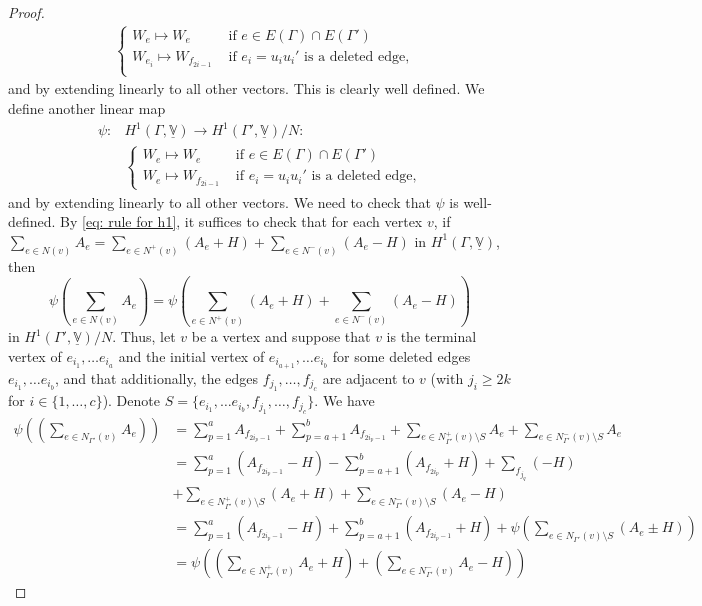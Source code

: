 \documentclass{article}
\theoremstyle{definition}
\theoremstyle{remark}
\begin{document}
\begin{proof}
\begin{equation*}
\begin{array}{cl}
   &\begin{cases}
    W_{e} \mapsto W_{e} &\text{ if $e\in E(\Gamma) \cap E(\Gamma') $}\\
   W_{e_i} \mapsto W_{f_{2i - 1}} &\text{ if $e_i=u_iu_{i}'$ is a deleted edge},\\
   \end{cases}
\end{array}
\end{equation*}
and by extending linearly to all other vectors. This is clearly well defined. We define another linear map
\begin{equation*}
\begin{array}{cl}
   \psi: &H^{1}(\Gamma, \underline{\mathbb{V}}) \rightarrow H^{1}(\Gamma', \underline{\mathbb{V}})/N:\\
   &\begin{cases}
    W_{e} \mapsto W_{e} &\text{ if $e \in E(\Gamma) \cap E(\Gamma')$}\\
    W_{e} \mapsto W_{f_{2i -1}} &\text{ if $e_i=u_iu_{i}'$ is a deleted edge,}
    \end{cases}
\end{array}
\end{equation*}
and by extending linearly to all other vectors.
We need to check that $\psi$ is well-defined. By \eqref{eq: rule for h1}, it suffices to check that for each vertex $v$, if $\sum_{e\in N(v)} A_{e} = \sum_{e\in N^{+}(v)} (A_{e} + H)+ \sum_{e\in N^{-}(v)} (A_{e} - H)$ in $H^{1}(\Gamma, \underline{\mathbb{V}})$, then
\begin{equation*}
    \psi \left(\sum_{e\in N(v)} A_{e}\right) = \psi\left( \sum_{e\in N^{+}(v)} (A_{e} + H)+ \sum_{e\in N^{-}(v)} (A_{e} - H)\right)
\end{equation*}
in $H^{1}(\Gamma', \underline{\mathbb{V}})/N$. 
Thus, let $v$ be a vertex and suppose that $v$ is the terminal vertex of $e_{i_1}, \dots e_{i_{a}}$ and the initial vertex of $e_{i_{a+1}}, \dots e_{i_{b}}$ for some deleted edges $e_{i_1}, \dots e_{i_b}$, and that additionally, the edges $f_{j_1}, \dots, f_{j_c}$ are adjacent to $v$ (with $j_i \geq 2k$ for $i\in \{1, \dots, c\}$). Denote $S= \{e_{i_1}, \dots e_{i_{b}}, f_{j_1},\dots, f_{j_c} \}$. 
We have
\begin{align*}
\psi(\left(\sum_{e\in N_{\Gamma'}(v)} A_{e}\right) ) &= \sum_{p = 1}^{a} A_{f_{2  i_{p} - 1}} + \sum_{p = a+1}^{b} A_{f_{2  i_{p} - 1}} + \sum_{e\in N_{\Gamma'}^{+}(v) \setminus S}  A_{e} + \sum_{e\in N_{\Gamma'}^{-}(v) \setminus S}  A_{e} \\
&= \sum_{p = 1}^{a} (A_{f_{2  i_{p} - 1}} - H) - \sum_{p = a+1}^{b} (A_{f_{2  i_{p}}} +H) + \sum_{f_{j_q}}( - H)\\
&+ \sum_{e\in N_{\Gamma'}^{+}(v) \setminus S}  (A_{e} + H)+ \sum_{e\in N_{\Gamma'}^{-}(v) \setminus S}  (A_{e} -H)\\
&= \sum_{p = 1}^{a} (A_{f_{2  i_{p} - 1}} - H) + \sum_{p = a+1}^{b} (A_{f_{2  i_{p} -1}} + H) + \psi(\sum_{e\in N_{\Gamma'}(v) \setminus S}  (A_{e} \pm H)) \\
&=  \psi\left( \left(\sum_{e\in N_{\Gamma'}^{+}(v)} A_{e} + H\right) + \left(\sum_{e\in N_{\Gamma'}^{-}(v)} A_{e} - H\right)\right)
\end{align*}


\end{proof}
\end{document}
